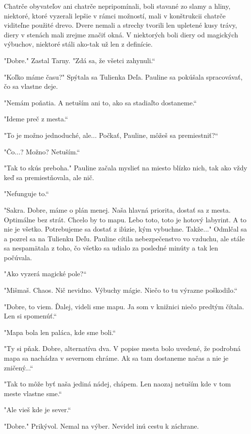 \documentclass{book}
\begin{document}
Chatrče obyvateľov ani chatrče nepripomínali, boli stavané zo slamy a hliny, niektoré, ktoré vyzerali lepšie v rámci možností, mali v konštrukcii chatrče viditeľne použité drevo. Dvere nemali a strechy tvorili len upletené kusy trávy, diery v stenách mali zrejme značiť okná. V niektorých boli diery od magických výbuchov, niektoré stáli ako-tak už len z definície.

"$ $Dobre."$ $ Zastal Tarny. "$ $Zdá sa, že všetci zahynuli.“

"$ $Koľko máme času?"$ $ Spýtala sa Tulienka Deľa. Pauline sa pokúšala spracovávať, čo sa vlastne deje.

"$ $Nemám poňatia. A netuším ani to, ako sa stadiaľto dostaneme.“

"$ $Ideme preč z mesta.“

"$ $To je možno jednoduché, ale... Počkať, Pauline, môžeš sa premiestniť?“

"$ $Čo...? Možno? Netuším.“

"$ $Tak to skús preboha."$ $ Pauline začala myslieť na miesto blízko nich, tak ako vždy keď sa premiestňovala, ale nič.

"$ $Nefunguje to.“

"$ $Sakra. Dobre, máme o plán menej. Naša hlavná priorita, dostať sa z mesta. Optimálne bez strát. Chcelo by to mapu. Lebo toto, toto je hotový labyrint. A to nie je všetko. Potrebujeme sa dostať z ilúzie, kým vybuchne. Takže..."$ $ Odmlčal sa a pozrel sa na Tulienku Deľu. Pauline cítila nebezpečenstvo vo vzduchu, ale stále sa nespamätala z toho, čo všetko sa udialo za posledné minúty a tak len počúvala.

"$ $Ako vyzerá magické pole?“

"$ $Mišmaš. Chaos. Nič nevidno. Výbuchy mágie. Niečo to tu výrazne poškodilo.“

"$ $Dobre, to viem. Ďalej, videli sme mapu. Ja som v knižnici niečo predtým čítala. Len si spomenúť.“

"$ $Mapa bola len paláca, kde sme boli.“

"$ $Ty si pňak. Dobre, alternatíva dva. V popise mesta bolo uvedené, že podrobná mapa sa nachádza v severnom chráme. Ak sa tam dostaneme načas a nie je zničený...“

"$ $Tak to môže byť naša jediná nádej, chápem. Len naozaj netuším kde v tom meste vlastne sme.“

"$ $Ale vieš kde je sever.“

"$ $Dobre."$ $ Prikývol. Nemal na výber. Nevidel inú cestu k záchrane.
\end{document}
